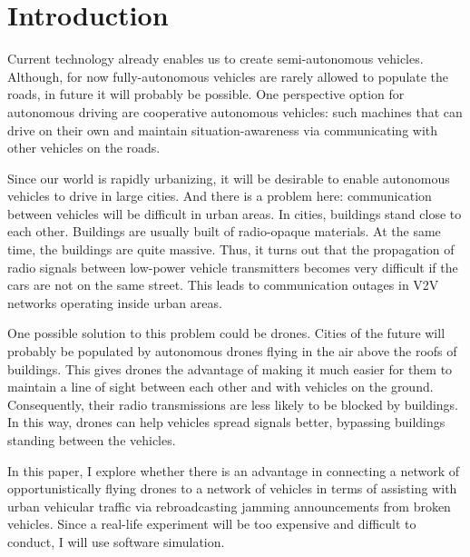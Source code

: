 \documentclass[]{nsm-thesis}
\begin{document}
\acresetall

\cleardoublepage
\setcounter{tocdepth}{1}
\tableofcontents

\cleardoublepage
{}



\chapter{Introduction}
\label{sec:introduction}

Current technology already enables us to create semi-autonomous vehicles. Although, for now fully-autonomous vehicles are rarely allowed to 
populate the roads, in future it will probably be possible. One perspective option for autonomous driving are cooperative autonomous vehicles: such machines
that can drive on their own and maintain situation-awareness via communicating with other vehicles on the roads.

Since our world is rapidly urbanizing, it will be desirable to enable autonomous vehicles to drive in large cities. And there is a problem here: communication between vehicles will be difficult in urban areas. In cities, buildings stand close to each other. Buildings are usually built of radio-opaque materials. At the same time, the buildings are quite massive. Thus, it turns out that the propagation of radio signals between low-power vehicle transmitters becomes very difficult if the cars are not on the same street. This leads to communication outages in \ac{V2V} networks operating inside urban areas.

One possible solution to this problem could be drones. Cities of the future will probably be populated by autonomous drones flying in the air above the roofs of buildings. This gives drones the advantage of making it much easier for them to maintain a line of sight between each other and with vehicles on the ground. Consequently, their radio transmissions are less likely to be blocked by buildings. In this way, drones can help vehicles spread signals better, bypassing buildings standing between the vehicles.

In this paper, I explore whether there is an advantage in connecting a network of opportunistically flying drones to a network of vehicles in terms of assisting with urban vehicular traffic via rebroadcasting jamming announcements from broken vehicles.
Since a real-life experiment will be too expensive and difficult to conduct, I will use software simulation.
\end{document}
